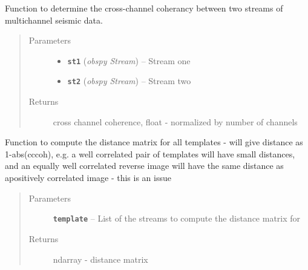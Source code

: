 \documentclass[a4paper,10pt,english]{sphinxmanual}
\begin{document}

\begin{fulllineitems}
\label{utils:clustering.cross_chan_coherence}
Function to determine the cross-channel coherancy between two streams of
multichannel seismic data.
\begin{quote}\begin{description}
\item[{Parameters}] \leavevmode\begin{itemize}
\item {} 
\textbf{\texttt{st1}} (\emph{obspy Stream}) -- Stream one

\item {} 
\textbf{\texttt{st2}} (\emph{obspy Stream}) -- Stream two

\end{itemize}

\item[{Returns}] \leavevmode
cross channel coherence, float - normalized by number of channels

\end{description}\end{quote}

\end{fulllineitems}


\begin{fulllineitems}
\label{utils:clustering.distance_matrix}
Function to compute the distance matrix for all templates - will give
distance as 1-abs(cccoh), e.g. a well correlated pair of templates will
have small distances, and an equally well correlated reverse image will
have the same distance as apositively correlated image - this is an issue
\begin{quote}\begin{description}
\item[{Parameters}] \leavevmode
\textbf{\texttt{template}} -- List of the streams to compute the distance matrix for

\item[{Returns}] \leavevmode
ndarray - distance matrix

\end{description}\end{quote}

\end{fulllineitems}
\end{document}
